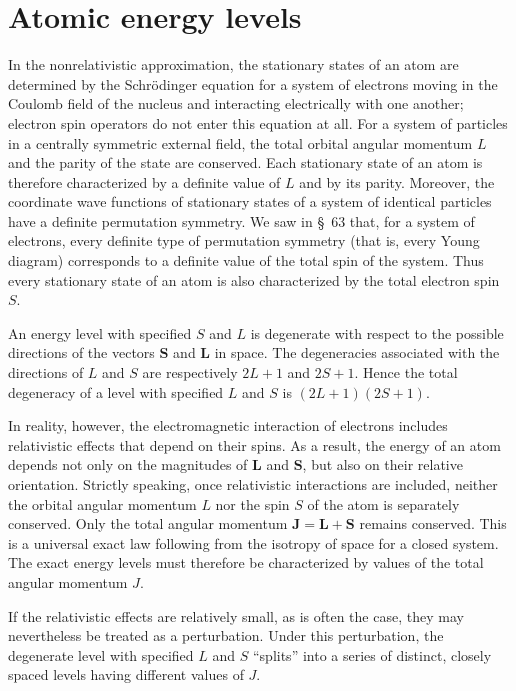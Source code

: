 \section{Atomic energy levels}

In the nonrelativistic approximation, the stationary states of an atom are determined by the Schrödinger equation for a system of electrons moving in the Coulomb field of the nucleus and interacting electrically with one another; electron spin operators do not enter this equation at all. For a system of particles in a centrally symmetric external field, the total orbital angular momentum $L$ and the parity of the state are conserved. Each stationary state of an atom is therefore characterized by a definite value of $L$ and by its parity. Moreover, the coordinate wave functions of stationary states of a system of identical particles have a definite permutation symmetry. We saw in \S~63 that, for a system of electrons, every definite type of permutation symmetry (that is, every Young diagram) corresponds to a definite value of the total spin of the system. Thus every stationary state of an atom is also characterized by the total electron spin $S$.

An energy level with specified $S$ and $L$ is degenerate with respect to the possible directions of the vectors $\mathbf S$ and $\mathbf L$ in space. The degeneracies associated with the directions of $L$ and $S$ are respectively $2L+1$ and $2S+1$. Hence the total degeneracy of a level with specified $L$ and $S$ is $(2L+1)(2S+1)$.

In reality, however, the electromagnetic interaction of electrons includes relativistic effects that depend on their spins. As a result, the energy of an atom depends not only on the magnitudes of $\mathbf L$ and $\mathbf S$, but also on their relative orientation. Strictly speaking, once relativistic interactions are included, neither the orbital angular momentum $L$ nor the spin $S$ of the atom is separately conserved. Only the total angular momentum $\mathbf J=\mathbf L+\mathbf S$ remains conserved. This is a universal exact law following from the isotropy of space for a closed system. The exact energy levels must therefore be characterized by values of the total angular momentum $J$.

If the relativistic effects are relatively small, as is often the case, they may nevertheless be treated as a perturbation. Under this perturbation, the degenerate level with specified $L$ and $S$ ``splits'' into a series of distinct, closely spaced levels having different values of $J$.

